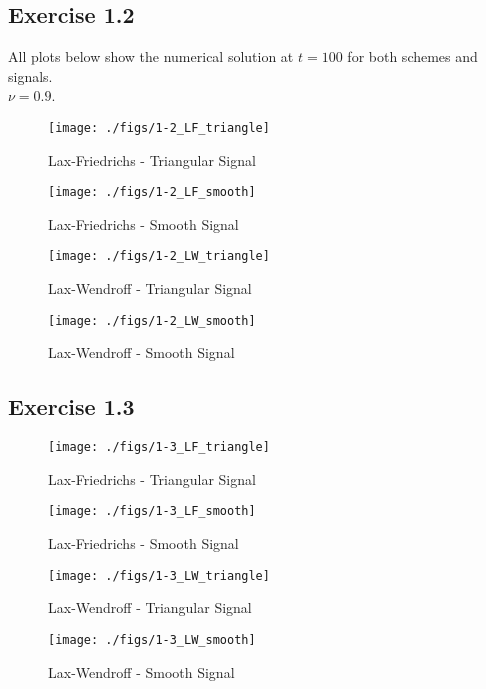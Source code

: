 \subsection{Exercise 1.2}
All plots below show the numerical solution at $t = 100$ for both schemes and signals. \\
$\nu = 0.9$.
\label{app:12}
\begin{figure}[H]
    \centering
    \texttt{[image: ./figs/1-2\_LF\_triangle]}
    \caption{Lax-Friedrichs - Triangular Signal}\label{fig:1-2_LF_triangle}
\end{figure}
\begin{figure}[H]
    \centering
    \texttt{[image: ./figs/1-2\_LF\_smooth]}
    \caption{Lax-Friedrichs - Smooth Signal}\label{fig:1-2_LF_smooth}
\end{figure}
\begin{figure}[H]
    \centering
    \texttt{[image: ./figs/1-2\_LW\_triangle]}
    \caption{Lax-Wendroff - Triangular Signal}\label{fig:1-2_LW_triangle}
\end{figure}
\begin{figure}[H]
    \centering
    \texttt{[image: ./figs/1-2\_LW\_smooth]}
    \caption{Lax-Wendroff - Smooth Signal}\label{fig:1-2_LW_smooth}
\end{figure}

\subsection{Exercise 1.3}
\label{app:13}
\begin{figure}[H]
    \centering
    \texttt{[image: ./figs/1-3\_LF\_triangle]}
    \caption{Lax-Friedrichs - Triangular Signal}\label{fig:1-3_LF_triangle}
\end{figure}
\begin{figure}[H]
    \centering
    \texttt{[image: ./figs/1-3\_LF\_smooth]}
    \caption{Lax-Friedrichs - Smooth Signal}\label{fig:1-3_LF_smooth}
\end{figure}
\begin{figure}[H]
    \centering
    \texttt{[image: ./figs/1-3\_LW\_triangle]}
    \caption{Lax-Wendroff - Triangular Signal}\label{fig:1-3_LW_triangle}
\end{figure}
\begin{figure}[H]
    \centering
    \texttt{[image: ./figs/1-3\_LW\_smooth]}
    \caption{Lax-Wendroff - Smooth Signal}\label{fig:1-3_LW_smooth}
\end{figure}




